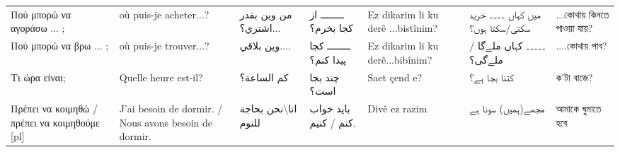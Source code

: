 \begin{longtable}{p{3.5cm} p{3.5cm} p{3.5cm} p{3.5cm} p{3.5cm} p{3.5cm} p{3.5cm} }
 Πού μπορώ να αγοράσω ... ;                                                                                                    & où puis-je acheter...?                                                                          & من وين بقدر اشتري؟...                                                                 & ــــــــ از کجا بخرم؟                                       & Ez dikarim li ku derê ...bistînim?                                                 & میں کہاں ۔۔۔۔ خرید سکتی/سکتا ہوں؟                                              & ...কোথায় কিনতে পাওয়া যায়?                                         \\
 Πού μπορώ να βρω ... ;                                                                                                        & où puis-je trouver...?                                                                          & وين بلاقي....                                                                         & ــــــــ کجا پیدا کنم؟                                      & Ez dikarim li ku derê...bibînim?                                                   & ۔۔۔۔۔ کہاں ملےگا / ملےگی؟                                                      & ....কোথায় পাব?                                                    \\
 Τι ώρα είναι;                                                                                                                 & Quelle heure est-il?                                                                            & كم الساعة؟                                                                            & چند بجا است؟                                                & Saet çend e?                                                                       & کتنا بجا ہے؟                                                                   & ক'টা বাজে?                                                        \\
 Πρέπει να κοιμηθώ / πρέπει να κοιμηθούμε [pl]                                                                                 & J'ai besoin de dormir. / Nous avons besoin de dormir.                                           & انا\textbackslash{}نحن بحاجة للنوم                                                                   & باید خواب کنم / کنیم.                                       & Divê ez razim                                                                      & مجھے(ہمیں) سونا ہے                                                             & আমাকে ঘুমাতে হবে                                                  \\

\end{longtable}
